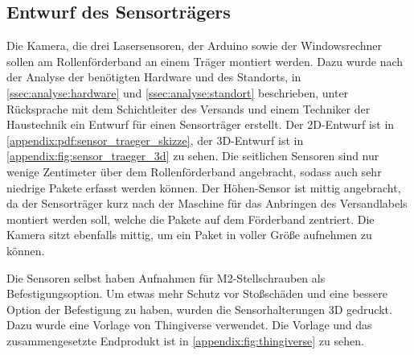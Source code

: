 \subsection{Entwurf des Sensorträgers}

Die Kamera, die drei Lasersensoren, der Arduino sowie der Windowsrechner sollen am Rollenförderband an einem Träger montiert werden. Dazu wurde nach der Analyse der benötigten Hardware und des Standorts, in \vref{ssec:analyse:hardware} und \vref{ssec:analyse:standort} beschrieben, unter Rücksprache mit dem Schichtleiter des Versands und einem Techniker der Haustechnik ein Entwurf für einen Sensorträger erstellt. Der 2D-Entwurf ist in \vref{appendix:pdf:sensor_traeger_skizze}, der 3D-Entwurf ist in \vref{appendix:fig:sensor_traeger_3d} zu sehen. Die seitlichen Sensoren sind nur wenige Zentimeter über dem Rollenförderband angebracht, sodass auch sehr niedrige Pakete erfasst werden können. Der Höhen-Sensor ist mittig angebracht, da der Sensorträger kurz nach der Maschine für das Anbringen des Versandlabels montiert werden soll, welche die Pakete auf dem Förderband zentriert. Die Kamera sitzt ebenfalls mittig, um ein Paket in voller Größe aufnehmen zu können.

Die Sensoren selbst haben Aufnahmen für M2-Stellschrauben als Befestigungsoption. Um etwas mehr Schutz vor Stoßschäden und eine bessere Option der Befestigung zu haben, wurden die Sensorhalterungen 3D gedruckt. Dazu wurde eine Vorlage von Thingiverse \autocite{thingiverse} verwendet. Die Vorlage und das zusammengesetzte Endprodukt ist in \vref{appendix:fig:thingiverse} zu sehen.